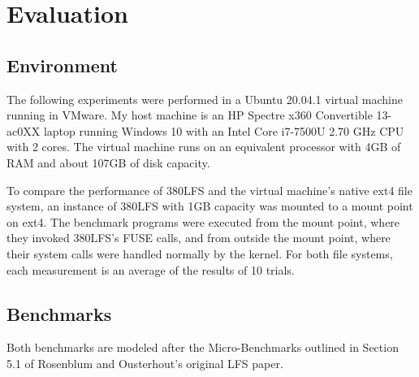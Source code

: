\documentclass{article}
\begin{document}
\section{Evaluation}
\subsection{Environment}

The following experiments were performed in a Ubuntu 20.04.1 virtual machine running in VMware. My host machine is an HP Spectre x360 Convertible 13-ac0XX laptop running Windows 10 with an Intel Core i7-7500U 2.70 GHz CPU with 2 cores. The virtual machine runs on an equivalent processor with 4GB of RAM and about 107GB of disk capacity.

To compare the performance of 380LFS and the virtual machine's native ext4 file system, an instance of 380LFS with 1GB capacity was mounted to a mount point on ext4. The benchmark programs were executed from the mount point, where they invoked 380LFS's FUSE calls, and from outside the mount point, where their system calls were handled normally by the kernel. For both file systems, each measurement is an average of the results of 10 trials.

\subsection{Benchmarks}

Both benchmarks are modeled after the Micro-Benchmarks outlined in Section 5.1 of Rosenblum and Ousterhout's original LFS paper.
\end{document}
